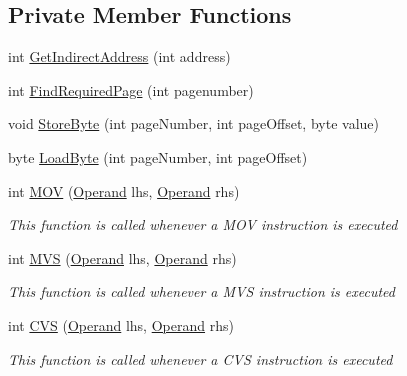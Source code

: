 \subsection*{Private Member Functions}
\begin{DoxyCompactItemize}
\item 
int \hyperlink{class_c_p_u___o_s___simulator_1_1_c_p_u_1_1_instruction_a23028ca69a391802540764b208a3faa1}{Get\+Indirect\+Address} (int address)
\item 
int \hyperlink{class_c_p_u___o_s___simulator_1_1_c_p_u_1_1_instruction_ae0e0e21063eeb9aa0dc0896e6e4c71dc}{Find\+Required\+Page} (int pagenumber)
\item 
void \hyperlink{class_c_p_u___o_s___simulator_1_1_c_p_u_1_1_instruction_a469a6252b1205ff79c93c2d75cafe0ce}{Store\+Byte} (int page\+Number, int page\+Offset, byte value)
\item 
byte \hyperlink{class_c_p_u___o_s___simulator_1_1_c_p_u_1_1_instruction_a494843084219f295941d08e8b0355050}{Load\+Byte} (int page\+Number, int page\+Offset)
\item 
int \hyperlink{class_c_p_u___o_s___simulator_1_1_c_p_u_1_1_instruction_af6548da603e7370f10de03e0da040a24}{M\+O\+V} (\hyperlink{class_c_p_u___o_s___simulator_1_1_c_p_u_1_1_operand}{Operand} lhs, \hyperlink{class_c_p_u___o_s___simulator_1_1_c_p_u_1_1_operand}{Operand} rhs)
\begin{DoxyCompactList}\small\item\em This function is called whenever a M\+O\+V instruction is executed \end{DoxyCompactList}\item 
int \hyperlink{class_c_p_u___o_s___simulator_1_1_c_p_u_1_1_instruction_a33723518d4e117877d2ecf5b861d2eb2}{M\+V\+S} (\hyperlink{class_c_p_u___o_s___simulator_1_1_c_p_u_1_1_operand}{Operand} lhs, \hyperlink{class_c_p_u___o_s___simulator_1_1_c_p_u_1_1_operand}{Operand} rhs)
\begin{DoxyCompactList}\small\item\em This function is called whenever a M\+V\+S instruction is executed \end{DoxyCompactList}\item 
int \hyperlink{class_c_p_u___o_s___simulator_1_1_c_p_u_1_1_instruction_a689065741dc51ddacf955b3781570546}{C\+V\+S} (\hyperlink{class_c_p_u___o_s___simulator_1_1_c_p_u_1_1_operand}{Operand} lhs, \hyperlink{class_c_p_u___o_s___simulator_1_1_c_p_u_1_1_operand}{Operand} rhs)
\begin{DoxyCompactList}\small\item\em This function is called whenever a C\+V\+S instruction is executed \end{DoxyCompactList}\item 

\end{DoxyCompactItemize}
